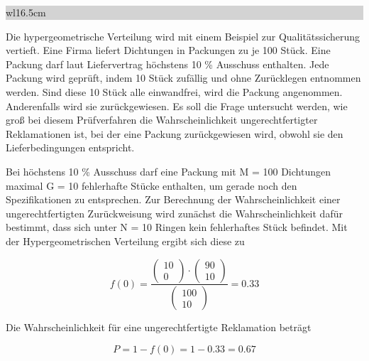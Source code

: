 \noindent
\colorbox{lightgray}{%
%
\renewcommand\arraystretch{0.6}%
\begin{tabular}{ wl{16.5cm} }
{}
\end{tabular}%
}\medskip 

\noindent Die hypergeometrische Verteilung wird mit einem Beispiel zur Qualit\"{a}tssicherung vertieft. Eine Firma liefert Dichtungen in Packungen zu je 100 St\"{u}ck. Eine Packung darf laut Liefervertrag h\"{o}chstens 10 \% Ausschuss enthalten. Jede Packung wird gepr\"{u}ft, indem 10 St\"{u}ck zuf\"{a}llig und ohne Zur\"{u}cklegen entnommen werden. Sind diese 10 St\"{u}ck alle einwandfrei, wird die Packung angenommen. Anderenfalls wird sie zur\"{u}ckgewiesen. Es soll die Frage untersucht werden, wie gro{\ss} bei diesem Pr\"{u}fverfahren die Wahrscheinlichkeit ungerechtfertigter Reklamationen ist, bei der eine Packung zur\"{u}ckgewiesen wird, obwohl sie den Lieferbedingungen entspricht.\newline

\noindent Bei h\"{o}chstens 10 \% Ausschuss darf eine Packung mit M = 100 Dichtungen maximal G = 10 fehlerhafte St\"{u}cke enthalten, um gerade noch den Spezifikationen zu entsprechen. Zur Berechnung der Wahrscheinlichkeit einer ungerechtfertigten Zur\"{u}ckweisung wird zun\"{a}chst die Wahrscheinlichkeit daf\"{u}r bestimmt, dass sich unter N = 10 Ringen kein fehlerhaftes St\"{u}ck befindet. Mit der Hypergeometrischen Verteilung ergibt sich diese zu

\begin{equation}\label{eq:fourhundredfourtytwo}
f(0)=\dfrac{\left(\begin{array}{c} {10} \\ 
{0} \end{array}\right)\cdot \left(\begin{array}{c} {90} \\ 
{10} \end{array}\right)}{\left(\begin{array}{c} {100} \\ 
{10} \end{array}\right)} =0.33
\end{equation}

\noindent Die Wahrscheinlichkeit f\"{u}r eine ungerechtfertigte Reklamation betr\"{a}gt 

\begin{equation}\label{eq:fourhundredfourtythree}
P=1-f(0)=1-0.33=0.67
\end{equation}

